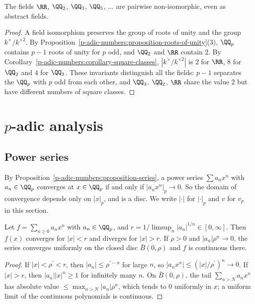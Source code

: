 \begin{corollary}\label{p-adic-numbers:corollary-non-isomorphic}
The fields $\RR$, $\QQ_2$, $\QQ_3$, $\QQ_5$, $\ldots$ are pairwise non-isomorphic, even as abstract fields.
\end{corollary}

\begin{proof}
A field isomorphism preserves the group of roots of unity and the group $k^\times/k^{\times2}$. By Proposition~\ref{p-adic-numbers:proposition-roots-of-unity}(3), $\QQ_p$ contains $p - 1$ roots of unity for $p$
odd, and $\QQ_2$ and $\RR$ contain $2$. By Corollary~\ref{p-adic-numbers:corollary-square-classes}, $|k^\times/k^{\times2}|$ is $2$ for $\RR$, $8$ for $\QQ_2$ and $4$ for $\QQ_3$. These invariants distinguish all
the fields: $p - 1$ separates the $\QQ_p$ with $p$ odd from each other, and $\QQ_3$, $\QQ_2$, $\RR$ share the value $2$ but have different numbers of square classes.
\end{proof}

\section{$p$-adic analysis}\label{p-adic-numbers:section-analysis}

\subsection{Power series}\label{p-adic-numbers:subsection-power-series}

By Proposition~\ref{p-adic-numbers:proposition-series}, a power series $\sum a_nx^n$ with $a_n \in \QQ_p$ converges at $x \in \QQ_p$ if and only if $|a_nx^n|_p \to 0$. So the domain of convergence depends only on
$|x|_p$, and is a disc. We write $|\cdot|$ for $|\cdot|_p$ and $v$ for $v_p$ in this section.

\begin{proposition}\label{p-adic-numbers:proposition-power-series}
Let $f = \sum_{n \geq 0}a_nx^n$ with $a_n \in \QQ_p$, and $r = 1/\limsup_n|a_n|^{1/n} \in [0, \infty]$. Then $f(x)$ converges for $|x| < r$ and diverges for $|x| > r$. If $\rho > 0$ and $|a_n|\rho^n \to 0$, the
series converges uniformly on the closed disc $\bar B(0, \rho)$ and $f$ is continuous there.
\end{proposition}

\begin{proof}
If $|x| < \rho^{\prime} < r$, then $|a_n| \leq \rho^{\prime-n}$ for large $n$, so $|a_nx^n| \leq (|x|/\rho^{\prime})^n \to 0$. If $|x| > r$, then $|a_n||x|^n \geq 1$ for infinitely many $n$. On $\bar B(0, \rho)$, the
tail $\sum_{n > N}a_nx^n$ has absolute value $\leq \max_{n > N}|a_n|\rho^n$, which tends to $0$ uniformly in $x$; a uniform limit of the continuous polynomials is continuous.
\end{proof}

